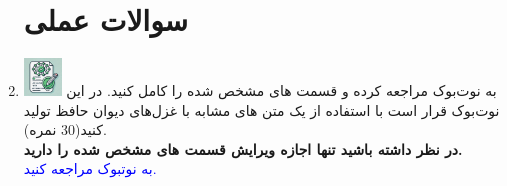 \documentclass[12pt]{article}
\begin{document}
\begin{enumerate}
    \section*{سوالات عملی} 
    \item \includegraphics[width=1cm]{figs/Allowed_with_contributino.jpg}
    به نوت‌بوک  مراجعه کرده و قسمت های مشخص شده را کامل کنید. در این نوت‌بوک قرار است با استفاده از یک   متن های مشابه با غزل‌های دیوان حافظ تولید کنید(30 نمره). \\
    \textbf{در نظر داشته باشید تنها اجازه ویرایش قسمت های مشخص شده را دارید.}\\
    \textcolor{blue}{
    به نوتبوک  مراجعه کنید.
    }


\end{enumerate}
\end{document}
